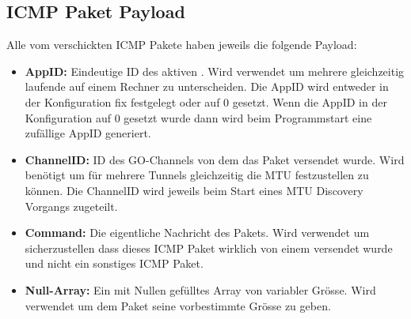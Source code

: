 \subsection{ICMP Paket Payload}
Alle vom \tool{} verschickten \acs{ICMP} Pakete haben jeweils die folgende Payload:

\begin{itemize}
  \item \textbf{AppID:} Eindeutige ID des aktiven \tool{}. Wird verwendet um mehrere gleichzeitig laufende \tool{} auf einem Rechner zu unterscheiden. Die AppID wird entweder in der Konfiguration fix festgelegt oder auf 0 gesetzt. Wenn die AppID in der Konfiguration auf 0 gesetzt wurde dann wird beim Programmstart eine zufällige AppID generiert.
  \item \textbf{ChannelID:} ID des GO-Channels von dem das Paket versendet wurde. Wird benötigt um für mehrere Tunnels gleichzeitig die \acs{MTU} festzustellen zu können. Die ChannelID wird jeweils beim Start eines \acs{MTU} Discovery Vorgangs zugeteilt.
  \item \textbf{Command:} Die eigentliche Nachricht des Pakets. Wird verwendet um sicherzustellen dass dieses \acs{ICMP} Paket wirklich von einem \tool{} versendet wurde und nicht ein sonstiges \acs{ICMP} Paket.
  \item \textbf{Null-Array:} Ein mit Nullen gefülltes Array von variabler Grösse. Wird verwendet um dem Paket seine vorbestimmte Grösse zu geben.
\end{itemize}

